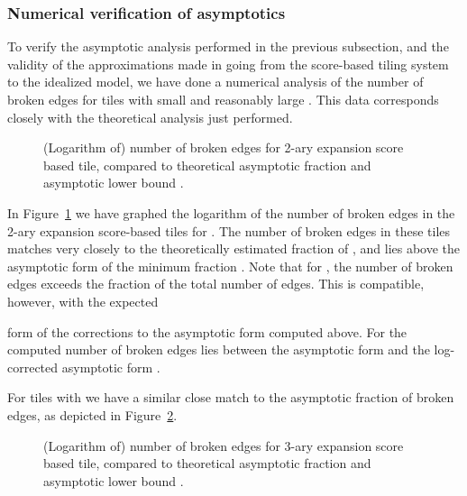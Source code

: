 \documentclass[12pt]{article}
\begin{document}
\subsubsection{Numerical verification of asymptotics}
\label{sec:numerical-asymptotics}

To verify the asymptotic analysis performed in the previous
subsection, and the validity of the approximations made in going from
the score-based tiling system to the idealized model, we have done a
numerical analysis of the number of broken edges for tiles with small
 and reasonably large .  This data corresponds closely with the
theoretical analysis just performed.

\begin{figure}
\begin{center}
\end{center}
\caption[x]{\footnotesize (Logarithm of) number of broken edges for
  2-ary expansion score based tile, compared to theoretical asymptotic
  fraction  and asymptotic lower bound .}
\label{f:numbers-2}
\end{figure}

In Figure~\ref{f:numbers-2} we have graphed the logarithm of the
number of broken edges in the 2-ary expansion score-based tiles for .  The number of broken edges in these tiles matches
very closely to the theoretically estimated fraction of , and
lies above the asymptotic form of the minimum fraction .
Note that for , the number of broken edges exceeds the
fraction  of the total number of edges.  This is compatible, however, with the expected 
 
form of the corrections to the asymptotic form computed above.  
For  the computed number of broken edges lies between the
asymptotic form  and the log-corrected asymptotic form
.

For tiles with  we have a similar close match to the asymptotic
fraction  of broken edges, as depicted in Figure~\ref{f:numbers-3}.
\begin{figure}
\begin{center}
\end{center}
\caption[x]{\footnotesize (Logarithm of) number of broken edges for
  3-ary expansion score based tile, compared to theoretical asymptotic
  fraction  and asymptotic lower bound .}
\label{f:numbers-3}
\end{figure}
\end{document}

